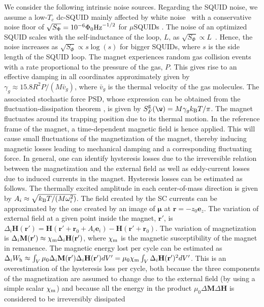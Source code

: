 \documentclass[twocolumn,superscriptaddress,floatfix,preprintnumbers,prl]{revtex4}
\begin{document}
We consider the following intrinsic noise sources. 
Regarding the SQUID noise, we assume a low-$T_c$ dc-SQUID mainly affected by white noise~\cite{SQUID_Bible} with a conservative  noise floor of $\sqrt{S_{\Phi}}=10^{-6}\Phi_0 {\rm Hz}^{-1/2}$ for $\mu$SQUIDs \cite{schurig_making_2014}. The noise of an optimized SQUID scales with the self-inductance of the loop, $L$, as $\sqrt{S_{\Phi}}\propto L$~\cite{SQUID_Bible}.
Hence, the noise increases as $\sqrt{S_{\Phi}}\propto s \log (s)$ for bigger SQUIDs, where $s$ is the side length of the SQUID loop. 
%
 The magnet experiences random gas collision events with a rate proportional to the pressure of the gas, $P$. This gives rise to an effective damping in all coordinates \cite{gamma_gas} approximately given by $\gamma_g \approx 15.8 R^2 P/(M \bar{v}_g)$, where $\bar{v}_g$ is the thermal velocity of the gas molecules. The associated stochastic force PSD, whose expression can be obtained from the fluctuation-dissipation theorem \cite{kuboFDT}, is given by $S_{F}^{\rm g}(\w) = M \gamma_g  k_{\rm B} T/\pi$. 
%
The magnet fluctuates around its trapping position due to its thermal motion. In the reference frame of the magnet, a time-dependent magnetic field is hence applied. This will cause small fluctuations of the magnetization of the magnet, thereby inducing magnetic losses leading to mechanical damping and a corresponding fluctuating force. In general, one can identify hysteresis losses due to the irreversible relation between the magnetization and the external field as well as eddy-current losses due to  induced currents in the magnet.  
Hysteresis losses can be estimated as follows.
The thermally excited amplitude in each center-of-mass direction is given by $A_i\approx \sqrt{k_{\rm B} T/(M \omega_i^2)}$.  
The field created by the SC currents can be approximated by the one created by an image of $\boldsymbol{\mu}$ at $\mathbf{r}=-z_0\mathbf{e}_z$. The variation of external field at a given point inside the magnet, $\mathbf{r}'$, is 
$\Delta_i \mathbf{H}(\mathbf{r}')=\mathbf{H}(\mathbf{r}'+\mathbf{r}_0+A_i \mathbf{e}_i)- \mathbf{H}(\mathbf{r}'+\mathbf{r}_0)$. The variation of magnetization is 
$\Delta_i \mathbf{M}(\mathbf{r}') \approx \chi_{\rm m} \Delta_i \mathbf{H}(\mathbf{r}')$, where $\chi_{\rm m}$ is the magnetic susceptibility of the magnet in remanence.
The magnetic energy lost per cycle can be estimated as 
$\Delta_i W_{\rm h} \approx \int_V \mu_0 \Delta_i \mathbf{M}(\mathbf{r}')\Delta_i \mathbf{H}(\mathbf{r}')dV'=\mu_0 \chi_{\rm m} \int_V\Delta_i \mathbf{H}(\mathbf{r}')^2 dV'$. This is an overestimation of the hysteresis loss per cycle, both because the three components of the magnetization are assumed to change due to the external field (by using a simple scalar $\chi_{\rm m}$) and because all the energy in the product $\mu_0 \Delta \mathbf{M}\Delta \mathbf{H}$ is considered to be irreversibly dissipated 
\end{document}
